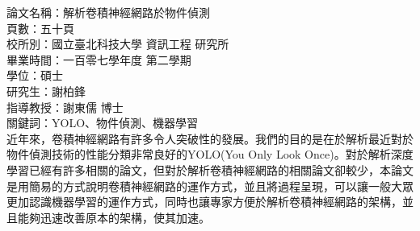 \begin{abstractCH}

\noindent
論文名稱：解析卷積神經網路於物件偵測\\
頁數：五十頁\\
校所別：國立臺北科技大學 資訊工程  研究所\\
畢業時間：一百零七學年度 第二學期\\
學位：碩士\\
研究生：謝柏鋒\\
指導教授：謝東儒 博士\\

\noindent
關鍵詞：YOLO、物件偵測、機器學習\\

近年來，卷積神經網路有許多令人突破性的發展。我們的目的是在於解析最近對於物件偵測技術的性能分類非常良好的YOLO(You Only Look Once)。對於解析深度學習已經有許多相關的論文，但對於解析卷積神經網路的相關論文卻較少，本論文是用簡易的方式說明卷積神經網路的運作方式，並且將過程呈現，可以讓一般大眾更加認識機器學習的運作方式，同時也讓專家方便於解析卷積神經網路的架構，並且能夠迅速改善原本的架構，使其加速。

\end{abstractCH}

